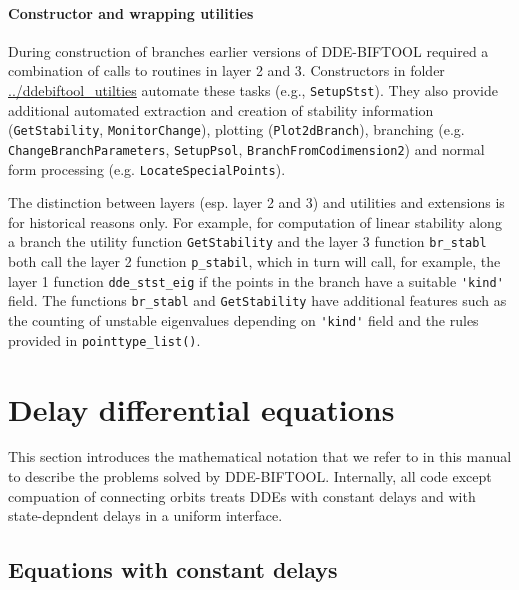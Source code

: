 \documentclass[10pt]{scrartcl}
\newcommand{\DDEBIFCODE}{\textsc{DDE-BIFTOOL}}
\newcommand{\blist}[1]{\mbox{\lstinline!#1!}}
\begin{document}
\paragraph{Constructor and wrapping utilities}
During construction of branches earlier versions of \DDEBIFCODE{}
required a combination of calls to routines in layer 2 and
3. Constructors in folder \url{../ddebiftool_utilties} automate these
tasks (e.g., \blist{SetupStst}). They also provide additional
automated extraction and creation of stability information
(\blist{GetStability}, \blist{MonitorChange}), plotting
(\blist{Plot2dBranch}), branching
(e.g. \blist{ChangeBranchParameters}, \blist{SetupPsol},
\blist{BranchFromCodimension2}) and normal form processing
(e.g. \blist{LocateSpecialPoints}).

The distinction between layers (esp. layer 2 and 3) and utilities and
extensions is for historical reasons only. For example, for
computation of linear stability along a branch the utility function
\blist{GetStability} and the layer 3 function \blist{br_stabl} both
call the layer 2 function \blist{p_stabil}, which in turn will call,
for example, the layer 1 function \blist{dde_stst_eig} if the points
in the branch have a suitable \blist{'kind'} field. The functions
\blist{br_stabl} and \blist{GetStability} have additional features
such as the counting of unstable eigenvalues depending on
\blist{'kind'} field and the rules provided in
\blist{pointtype_list()}.


\section{Delay differential equations}\label{explain_dde}
\label{sec:ddes}
This section introduces the mathematical notation that we refer to in
this manual to describe the problems solved by
\DDEBIFCODE{}. Internally, all code except compuation of connecting
orbits treats DDEs with constant delays and with state-depndent delays
in a uniform interface.
\subsection{Equations with constant delays}\label{dde}
\end{document}
